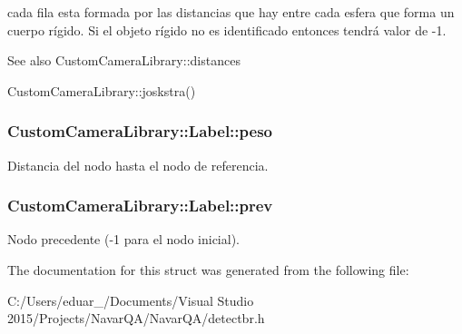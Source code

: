 cada fila esta formada por las distancias que hay entre cada esfera que forma un cuerpo rígido. Si el objeto rígido no es identificado entonces tendrá valor de -\/1. \begin{DoxySeeAlso}{See also}
Custom\+Camera\+Library\+::distances 

Custom\+Camera\+Library\+::joskstra() 
\end{DoxySeeAlso}
\subsubsection[{\texorpdfstring{peso}{peso}}]{\setlength{\rightskip}{0pt plus 5cm}Custom\+Camera\+Library\+::\+Label\+::peso}\hypertarget{struct_custom_camera_library_1_1_label_a2c76fc89c6d5ebd560e1081d456052fc}{}\label{struct_custom_camera_library_1_1_label_a2c76fc89c6d5ebd560e1081d456052fc}
Distancia del nodo hasta el nodo de referencia. 
\subsubsection[{\texorpdfstring{prev}{prev}}]{\setlength{\rightskip}{0pt plus 5cm}Custom\+Camera\+Library\+::\+Label\+::prev}\hypertarget{struct_custom_camera_library_1_1_label_ab2b02b75eea4dbbce1a157e27142019f}{}\label{struct_custom_camera_library_1_1_label_ab2b02b75eea4dbbce1a157e27142019f}
Nodo precedente (-\/1 para el nodo inicial). 

The documentation for this struct was generated from the following file\+:\begin{DoxyCompactItemize}
\item 
C\+:/\+Users/eduar\+\_/\+Documents/\+Visual Studio 2015/\+Projects/\+Navar\+Q\+A/\+Navar\+Q\+A/detectbr.\+h\end{DoxyCompactItemize}

